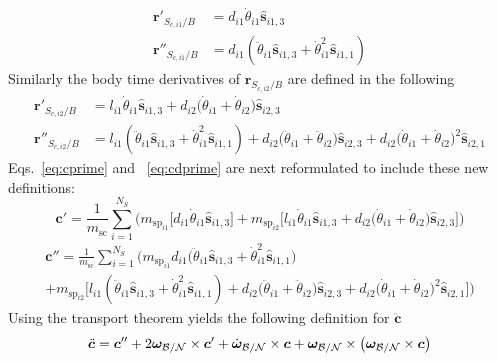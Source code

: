 \documentclass[paper]{aiaaNew}
\begin{document}
	\begin{align}
	\bm{r}'_{S_{c,i1}/B} &= d_{i1} \dot{\theta}_{i1} \bm{\hat{s}}_{i1,3}
	\label{eq:drcgspi1}
\\
	\bm{r}''_{S_{c,i1}/B} &= d_{i1} \left(\ddot{\theta}_{i1} \bm{\hat{s}}_{i1,3} + \dot{\theta}_{i1}^2 \bm{\hat{s}}_{i1,1}\right)
	\label{eq:ddrcgspi1}
	\end{align}
	Similarly the body time derivatives of $\bm{r}_{S_{c,i2}/B}$ are defined in the following
	\begin{align}
	\bm{r}'_{S_{c,i2}/B} &= l_{i1} \dot{\theta}_{i1} \bm{\hat{s}}_{i1,3} + d_{i2}\big(\dot{\theta}_{i1} + \dot{\theta}_{i2}\big)\bm{\hat{s}}_{i2,3}
	\label{eq:drcgspi2}
\\
	\bm{r}''_{S_{c,i2}/B} &= l_{i1} \left(\ddot{\theta}_{i1} \bm{\hat{s}}_{i1,3} + \dot{\theta}_{i1}^2 \bm{\hat{s}}_{i1,1}\right) + d_{i2}\big(\ddot{\theta}_{i1} + \ddot{\theta}_{i2}\big)\bm{\hat{s}}_{i2,3} + d_{i2}\big(\dot{\theta}_{i1} + \dot{\theta}_{i2}\big)^2\bm{\hat{s}}_{i2,1}
	\label{eq:ddrcgspi2}
	\end{align}
	Eqs.~\eqref{eq:cprime} and ~\eqref{eq:cdprime} are next reformulated to include these new definitions:
	\begin{equation}
	\bm{c}' = \frac{1}{m_{\text{sc}}}\sum_{i=1}^{N_{S}}\bigg(m_{\text{sp}_{i1}}\Big[d_{i1} \dot{\theta}_{i1} \bm{\hat{s}}_{i1,3}\Big]+m_{\text{sp}_{i2}}\Big[l_{i1} \dot{\theta}_{i1} \bm{\hat{s}}_{i1,3} + d_{i2}\big(\dot{\theta}_{i1} + \dot{\theta}_{i2}\big)\bm{\hat{s}}_{i2,3}\Big]\bigg)
	\label{eq:cprime2}
	\end{equation}
	\begin{multline}
	\bm{c}'' = \frac{1}{m_{\text{sc}}}\sum_{i=1}^{N_{S}}\bigg(m_{\text{sp}_{i1}}d_{i1} \big(\ddot{\theta}_{i1} \bm{\hat{s}}_{i1,3} + \dot{\theta}_{i1}^2 \bm{\hat{s}}_{i1,1}\big)\\
	+m_{\text{sp}_{i2}}\Big[l_{i1} \left(\ddot{\theta}_{i1} \bm{\hat{s}}_{i1,3} + \dot{\theta}_{i1}^2 \bm{\hat{s}}_{i1,1}\right) + d_{i2}\big(\ddot{\theta}_{i1} + \ddot{\theta}_{i2}\big)\bm{\hat{s}}_{i2,3} + d_{i2}\big(\dot{\theta}_{i1} + \dot{\theta}_{i2}\big)^2\bm{\hat{s}}_{i2,1}\Big]\bigg)
	\label{eq:cdprime2}
	\end{multline}
	Using the transport theorem\cite{schaub} yields the following definition for $\ddot{\bm c}$
	\begin{equation}
	\ddot{\bm c} = \bm{c}'' + 2\bm\omega_{\cal B/N}\times\bm{c}'+\dot{\bm\omega}_{\cal B/N}\times\bm{c}+\bm\omega_{\cal B/N}\times\left(\bm\omega_{\cal B/N}\times\bm{c}\right)
	\label{eq:cddot}
	\end{equation}
\end{document}
